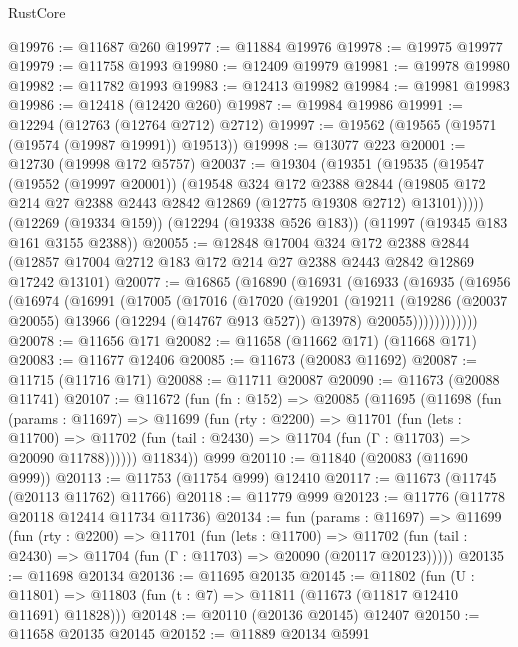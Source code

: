 \begin{lexlean}{RustCore}
\begin{coremodule}
@19976 := @11687 @260
@19977 := @11884 @19976
@19978 := @19975 @19977
@19979 := @11758 @1993
@19980 := @12409 @19979
@19981 := @19978 @19980
@19982 := @11782 @1993
@19983 := @12413 @19982
@19984 := @19981 @19983
@19986 := @12418 (@12420 @260)
@19987 := @19984 @19986
@19991 := @12294 (@12763 (@12764 @2712) @2712)
@19997 := @19562 (@19565 (@19571 (@19574 (@19987 @19991)) @19513))
@19998 := @13077 @223
@20001 := @12730 (@19998 @172 @5757)
@20037 := @19304
    (@19351
      (@19535
        (@19547
          (@19552 (@19997 @20001))
          (@19548
            @324
            @172
            @2388
            @2844
            (@19805 @172 @214 @27 @2388 @2443 @2842 @12869 (@12775 @19308 @2712) @13101)))))
    (@12269 (@19334 @159))
    (@12294 (@19338 @526 @183))
    (@11997 (@19345 @183 @161 @3155 @2388))
@20055 := @12848
    @17004
    @324
    @172
    @2388
    @2844
    (@12857 @17004 @2712 @183 @172 @214 @27 @2388 @2443 @2842 @12869 @17242 @13101)
@20077 := @16865
    (@16890
      (@16931
        (@16933
          (@16935
            (@16956
              (@16974
                (@16991
                  (@17005
                    (@17016
                      (@17020
                        (@19201
                          (@19211
                            (@19286 (@20037 @20055) @13966 (@12294 (@14767 @913 @527)) @13978)
                            @20055))))))))))))
@20078 := @11656 @171
@20082 := @11658 (@11662 @171) (@11668 @171)
@20083 := @11677 @12406
@20085 := @11673 (@20083 @11692)
@20087 := @11715 (@11716 @171)
@20088 := @11711 @20087
@20090 := @11673 (@20088 @11741)
@20107 := @11672
    (fun (fn : @152) =>
    @20085
      (@11695
        (@11698
          (fun (params : @11697) =>
          @11699
            (fun (rty : @2200) =>
            @11701
              (fun (lets : @11700) =>
              @11702 (fun (tail : @2430) => @11704 (fun (Γ : @11703) => @20090 @11788))))))
        @11834))
    @999
@20110 := @11840 (@20083 (@11690 @999))
@20113 := @11753 (@11754 @999) @12410
@20117 := @11673 (@11745 (@20113 @11762) @11766)
@20118 := @11779 @999
@20123 := @11776 (@11778 @20118 @12414 @11734 @11736)
@20134 := fun (params : @11697) =>
  @11699
    (fun (rty : @2200) =>
    @11701
      (fun (lets : @11700) =>
      @11702 (fun (tail : @2430) => @11704 (fun (Γ : @11703) => @20090 (@20117 @20123)))))
@20135 := @11698 @20134
@20136 := @11695 @20135
@20145 := @11802
    (fun (U : @11801) => @11803 (fun (t : @7) => @11811 (@11673 (@11817 @12410 @11691) @11828)))
@20148 := @20110 (@20136 @20145) @12407
@20150 := @11658 @20135 @20145
@20152 := @11889 @20134 @5991

\end{coremodule}
\end{lexlean}
